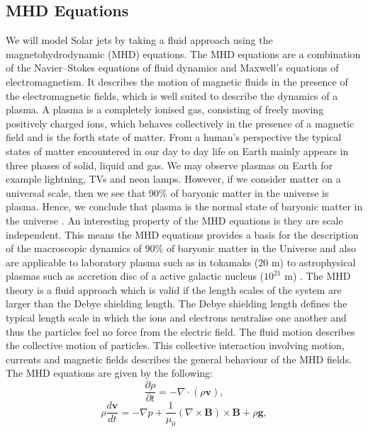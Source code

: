 \documentclass[12pt]{ociamthesis}
\begin{document}
\subsection{MHD Equations} 
We will model Solar jets by taking a fluid approach using the magnetohydrodynamic (MHD) equations. The MHD equations are a combination of the Navier$–$Stokes equations of fluid dynamics and  Maxwell's equations of electromagnetism. It describes the motion of magnetic fluids in the presence of the electromagnetic fields, which is well suited to describe the dynamics of a plasma. A plasma is a completely ionised gas, consisting of freely moving positively charged ions, which behaves collectively in the presence of a magnetic field and is the forth state of matter. From a human's perspective the typical states of matter encountered in our day to day life on Earth mainly appears in three phases of solid, liquid and gas. We may observe plasmas on Earth for example lightning, TVs and neon lamps. However, if we consider matter on a universal scale, then we see that $90 \%$ of baryonic matter in the universe is plasma. Hence, we conclude that plasma is the normal state of baryonic matter in the universe \citep{goedbloed2004principles}. An interesting property of the MHD equations is they are scale independent. This means the MHD equations provides a basis for the description of the macroscopic dynamics of $90 \%$ of baryonic matter in the Universe and also are applicable to laboratory plasma such as in tokamaks ($20$ m) to astrophysical plasmas such as accretion disc of a active galactic nucleus ($10^{21}$  m) \citep{goedbloed2004principles}. The MHD theory is a fluid approach which is valid if the length scales of the system are larger than the Debye shielding length. The Debye shielding length defines the typical length scale in which the ions and electrons neutralise one another and thus the particles feel no force from the electric field. The fluid motion describes the collective motion of particles. This collective interaction involving motion, currents and magnetic fields describes the general behaviour of the MHD fields. The MHD equations are given by the following:      
\begin{equation}\label{eq86}
\frac{\partial \rho}{\partial t} = - \nabla \cdot (\rho \boldsymbol{v}),
\end{equation}
\begin{equation}\label{eq87}
\rho \frac{d \boldsymbol{v}}{dt} = - \nabla p + \frac{1}{\mu_0} (\nabla \times \boldsymbol{B}) \times \boldsymbol{B} + \rho \boldsymbol{g},
\end{equation}
\end{document}
